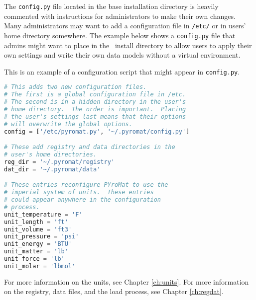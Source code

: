 The \texttt{config.py} file located in the base installation directory is heavily commented with instructions for administrators to make their own changes.  Many administrators may want to add a configuration file in \texttt{/etc/} or in users' home directory somewhere.  The example below shows a \texttt{config.py} file that admins might want to place in the \PM\ install directory to allow users to apply their own settings and write their own data models without a virtual environment.

This is an example of a configuration script that might appear in \verb|config.py|.

\begin{lstlisting}[language=Python]
# This adds two new configuration files. 
# The first is a global configuration file in /etc.
# The second is in a hidden directory in the user's
# home directory.  The order is important.  Placing
# the user's settings last means that their options
# will overwrite the global options.
config = ['/etc/pyromat.py', '~/.pyromat/config.py']

# These add registry and data directories in the 
# user's home directories.
reg_dir = '~/.pyromat/registry'
dat_dir = '~/.pyromat/data'

# These entries reconfigure PYroMat to use the 
# imperial system of units.  These entries 
# could appear anywhere in the configuration 
# process.
unit_temperature = 'F'
unit_length = 'ft'
unit_volume = 'ft3'
unit_pressure = 'psi'
unit_energy = 'BTU'
unit_matter = 'lb'
unit_force = 'lb'
unit_molar = 'lbmol'
\end{lstlisting}

For more information on the units, see Chapter \ref{ch:units}.  For more information on the registry, data files, and the load process, see Chapter \ref{ch:regdat}.
